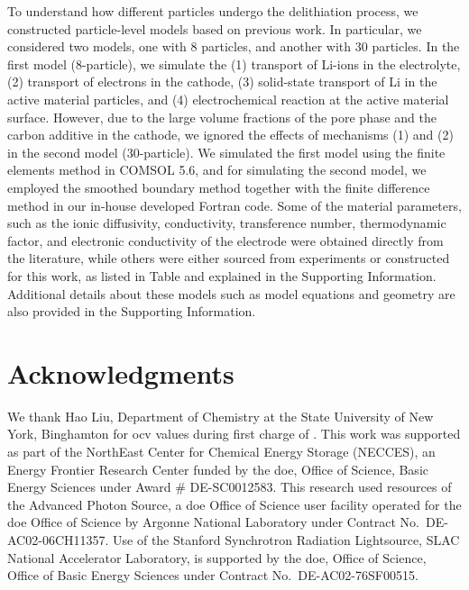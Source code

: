 \documentclass{article}
\begin{document}
To understand how different particles undergo the delithiation
process, we constructed particle-level models based on previous
work\cite{thornton2014-2}. In particular, we considered two models, one with 8 particles,
and another with 30 particles. In the first model (8-particle), we
simulate the (1) transport of Li-ions in the electrolyte, (2)
transport of electrons in the cathode, (3) solid-state transport of Li in
the active material particles, and (4) electrochemical reaction at the
active material surface. However, due to the large volume fractions of
the pore phase and the carbon additive in the cathode, we ignored the
effects of mechanisms (1) and (2) in the second model
(30-particle). We simulated the first model using the finite elements
method in COMSOL 5.6, and for simulating the second model, we employed
the smoothed boundary method \cite{thornton2012} together with the
finite difference method in our in-house developed Fortran code. Some
of the material parameters, such as the ionic diffusivity,
conductivity, transference number, thermodynamic factor, and
electronic conductivity of the \nca{} electrode were obtained directly
from the literature\cite{lindbergh2008,lindbergh2008-2}, while others
were either sourced from experiments or constructed for this work, as
listed in Table  and explained in the
Supporting Information. Additional details about these models such as
model equations and geometry are also provided in the Supporting
Information.


\section*{Acknowledgments}

We thank Hao Liu, Department of Chemistry at the State University of
New York, Binghamton for \gls{ocv} values during first charge of
\nca{}. This work was supported as part of the NorthEast Center for
Chemical Energy Storage (NECCES), an Energy Frontier Research Center
funded by the \gls{doe}, Office of Science, Basic Energy Sciences
under Award \# DE-SC0012583. This research used resources of the
Advanced Photon Source, a \gls{doe} Office of Science user facility
operated for the \gls{doe} Office of Science by Argonne National
Laboratory under Contract No.\ DE-AC02-06CH11357. Use of the Stanford
Synchrotron Radiation Lightsource, SLAC National Accelerator
Laboratory, is supported by the \gls{doe}, Office of Science, Office
of Basic Energy Sciences under Contract No.\ DE-AC02-76SF00515.
\end{document}
